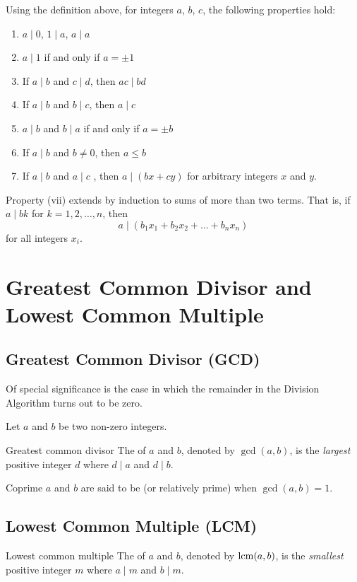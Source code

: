 Using the definition above, for integers $a$, $b$, $c$, the following properties hold:
\begin{enumerate}[label=(\roman*)]
\item $a \mid 0$, $1\mid a$, $a \mid a$
\item $a \mid 1$ if and only if $a = \pm 1$
\item If $a \mid b$ and $c \mid d$, then $ac \mid bd$
\item If $a \mid b$ and $b \mid c$, then $a \mid c$
\item $a \mid b$ and $b \mid a$ if and only if $a = \pm b$
\item If $a \mid b$ and $b \neq 0$, then $a \le b$
\item If $a \mid b$ and $a \mid c$ , then $a \mid(bx + cy)$ for arbitrary integers $x$ and $y$.
\end{enumerate}

\begin{remark}
Property (vii) extends by induction to sums of more than two terms. That is, if $a \mid bk$ for $k=1,2,\dots,n$, then
\[  a \mid(b_1x_1 + b_2x_2 + \dots + b_n x_n) \]
for all integers $x_i$.
\end{remark}
\pagebreak

\section{Greatest Common Divisor and Lowest Common Multiple}
\subsection{Greatest Common Divisor (GCD)}
Of special significance is the case in which the remainder in the Division Algorithm turns out to be zero.

Let $a$ and $b$ be two non-zero integers.

\begin{defn}{Greatest common divisor}{}
The  of $a$ and $b$, denoted by $\gcd(a,b)$, is the \emph{largest} positive integer $d$ where $d \mid a$ and $d \mid b$.
\end{defn}

\begin{defn}{Coprime}{}
$a$ and $b$ are said to be  (or relatively prime) when $\gcd(a,b)=1$.
\end{defn}

\subsection{Lowest Common Multiple (LCM)}
\begin{defn}{Lowest common multiple}{}
The  of $a$ and $b$, denoted by $\operatorname{lcm}(a,b)$, is the \emph{smallest} positive integer $m$ where $a \mid m$ and $b \mid m$.
\end{defn}

